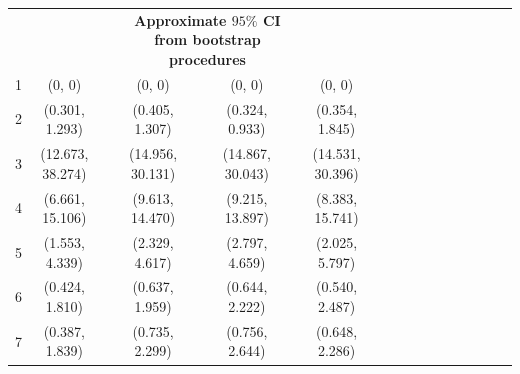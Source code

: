 \documentclass[a4paper 12pt]{article}
\numberwithin{equation}{section}
\begin{document}
\begin{small}
\begin{table}[h!]
\begin{tabular}{cccccccccccccccccc}
 &&& \multicolumn{4}{c}{\bf Approximate $95 \%$ CI from bootstrap procedures} \\[1.5ex]
1  & (0, 0)           & &   (0, 0)          & & (0, 0)           & &(0, 0)          & \\[1ex]
2  & (0.301, 1.293)   & &  (0.405, 1.307)   & & (0.324, 0.933)   & &(0.354, 1.845)  & \\[1ex]
3  & (12.673, 38.274) & & (14.956, 30.131)  & & (14.867, 30.043) & &(14.531, 30.396)&  \\[1ex]
4  & (6.661, 15.106)  & & (9.613, 14.470)   & & (9.215, 13.897)  & &(8.383, 15.741) & \\[1ex]
5  & (1.553, 4.339)   & &  (2.329, 4.617)   & & (2.797, 4.659)   & &(2.025, 5.797)  & \\[1ex]
6  & (0.424, 1.810)   & & (0.637, 1.959)    & & (0.644, 2.222)   & &(0.540, 2.487)  & \\[1ex]
7  & (0.387, 1.839)   & &  (0.735, 2.299)   & & (0.756, 2.644)   & &(0.648, 2.286)  & \\[1ex]
\hline
\end{tabular}
\end{table}
\end{small}
\end{document}
